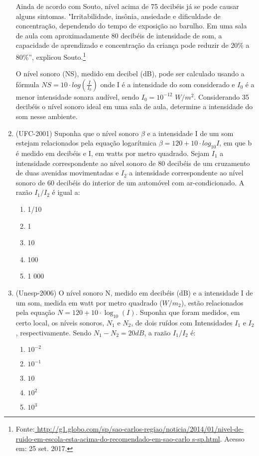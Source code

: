 \begin{enumerate}
Ainda de acordo com Souto, nível acima de 75 decibéis já se pode causar alguns sintomas. "Irritabilidade, 
insônia, 
ansiedade e dificuldade de concentração, dependendo do tempo de exposição ao barulho. Em uma sala de aula com 
aproximadamente 80 decibéis de intensidade de som, a capacidade de aprendizado e concentração da criança pode reduzir de 
20{\%} a 80{\%}”, explicou 
Souto.\footnote{Fonte:\url{
http://g1.globo.com/sp/sao-carlos-regiao/noticia/2014/01/nivel-de-ruido-em-escola-esta-acima-do-recomendado-em-sao-carlo
s-sp.html}. Acesso em: 25 set. 2017.}

 O nível sonoro (NS), medido em decibel (dB), pode ser calculado usando a fórmula $NS=10\cdot log(\frac{I}{I_0})$ onde I 
é a intensidade do som considerado e $I_0$ é a menor intensidade sonara audível, sendo  $I_0=10^{-12}$ $W/m^2$. 
Considerando 35 decibéis o nível sonoro ideal em uma sala de aula, determine a intensidade do som nesse ambiente.


\item {}\label{UFC2001}

(UFC-2001) Suponha que o nível sonoro $\beta$ e a intensidade I de um som estejam relacionados pela equação logarítmica 
$\beta = 120 + 10\cdot log_{10} I$, em que b é medido em decibéis e I, em watts por metro quadrado. Sejam $I_1$ a 
intensidade correspondente ao nível sonoro de 80 decibéis de um cruzamento de duas avenidas movimentadas e $I_2$ a 
intensidade correspondente ao nível sonoro de 60 decibéis do interior de um automóvel com ar-condicionado. A razão 
$I_1/I_2$ é igual a:
 \begin{enumerate}

     \item 1/10
     \item 1
     \item 10 
     \item 100
     \item 1 000
 \end{enumerate}


\item {}\label{Unesp2006}

(Unesp-2006) O nível sonoro N, medido em decibéis (dB) e a intensidade I de um som, medida em watt por metro quadrado 
($W/m_2$), estão relacionados pela equação $N=120+10\cdot \log_{10} (I)$. Suponha que foram medidos, em certo local, os 
níveis sonoros, $N_1$ e $N_2$, de dois ruídos com Intensidades $I_1$ e $I_2$, respectivamente. Sendo $N_1 - N_2 = 20 dB$, 
a razão $I_1/I_2$ é:
\begin{enumerate}
    \item $10^{-2}$
    \item $10^{-1}$
     \item $10$
     \item $10^{2}$
     \item $10^{3}$
\end{enumerate}



\end{enumerate}
